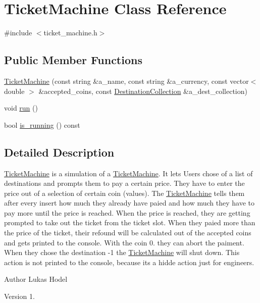 \hypertarget{classTicketMachine}{\section{Ticket\-Machine Class Reference}
\label{classTicketMachine}
}


{\ttfamily \#include $<$ticket\-\_\-machine.\-h$>$}

\subsection*{Public Member Functions}
\begin{DoxyCompactItemize}
\item 
\hyperlink{classTicketMachine_ad69449ce9b776af44f68482916351186}{Ticket\-Machine} (const string \&a\-\_\-name, const string \&a\-\_\-currency, const vector$<$ double $>$ \&accepted\-\_\-coins, const \hyperlink{classDestinationCollection}{Destination\-Collection} \&a\-\_\-dest\-\_\-collection)
\item 
void \hyperlink{classTicketMachine_a8d68bde6ee1a9a5f08182df963c1b0a9}{run} ()
\item 
bool \hyperlink{classTicketMachine_acaef19321ea4f8f647c86f514608b99a}{is\-\_\-running} () const 
\end{DoxyCompactItemize}


\subsection{Detailed Description}
\hyperlink{classTicketMachine}{Ticket\-Machine} is a simulation of a \hyperlink{classTicketMachine}{Ticket\-Machine}. It lets Users chose of a list of destinations and prompts them to pay a certain price. They have to enter the price out of a selection of certain coin (values). The \hyperlink{classTicketMachine}{Ticket\-Machine} tells them after every insert how much they already have paied and how much they have to pay more until the price is reached. When the price is reached, they are getting prompted to take out the ticket from the ticket slot. When they paied more than the price of the ticket, their refound will be calculated out of the accepted coins and gets printed to the console. With the coin 0. they can abort the paiment. When they chose the destination -\/1 the \hyperlink{classTicketMachine}{Ticket\-Machine} will shut down. This action is not printed to the console, because its a hidde action just for engineers.

\begin{DoxyAuthor}{Author}
Lukas Hodel 
\end{DoxyAuthor}
\begin{DoxyVersion}{Version}
1. 
\end{DoxyVersion}


